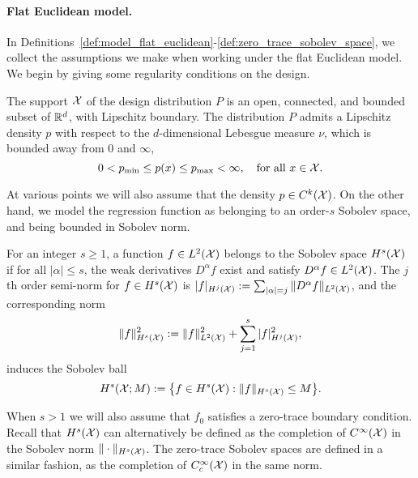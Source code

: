 \paragraph{Flat Euclidean model.}
In Definitions~\ref{def:model_flat_euclidean}-\ref{def:zero_trace_sobolev_space}, we collect the assumptions we make when working under the flat Euclidean model. We begin by giving some regularity conditions on the design.

\begin{definition}
	\label{def:model_flat_euclidean}
	The support $\mathcal{X}$ of the design distribution $P$ is an open, connected, and bounded subset of $\mathbb{R}^d$, with Lipschitz boundary. The distribution $P$ admits a Lipschitz density $p$ with respect to the $d$-dimensional Lebesgue measure $\nu$, which is bounded away from $0$ and $\infty$,
	\begin{equation*}
	0 < p_{\min} \leq p(x) \leq p_{\max} < \infty, \quad \textrm{for all $x \in \mathcal{X}$.}
	\end{equation*}
\end{definition}
At various points we will also assume that the density $p \in C^k(\mathcal{X})$. On the other hand, we model the regression function as belonging to an order-$s$ Sobolev space, and being bounded in Sobolev norm.
\begin{definition}
	\label{def:sobolev_space}
	For an integer $s \geq 1$, a function $f \in L^2(\mathcal{X})$ belongs to the Sobolev space $H^s(\mathcal{X})$ if for all $|\alpha| \leq s$, the weak derivatives $D^{\alpha}f$ exist and satisfy $D^{\alpha}f \in L^2(\mathcal{X})$. The $j$th order semi-norm for $f \in H^s(\mathcal{X})$ is $|f|_{H^j(\mathcal{X})} := \sum_{|\alpha| = j}\|D^{\alpha}f\|_{L^2(\mathcal{X})}$, and the corresponding norm
	\begin{equation*}
	\|f\|_{H^s(\mathcal{X})}^2 := \|f\|_{L^2(\mathcal{X})}^2 + \sum_{j = 1}^{s} |f|_{H^j(\mathcal{X})}^2,
	\end{equation*}
	induces the Sobolev ball
	\begin{equation*}
	H^s(\mathcal{X};M) := \bigl\{f \in H^s(\mathcal{X}): \|f\|_{H^s(\mathcal{X})} \leq M\bigr\}.
	\end{equation*} 
\end{definition}
When $s > 1$ we will also assume that $f_0$ satisfies a zero-trace boundary condition. Recall that $H^s(\mathcal{X})$ can alternatively be defined as the completion of $C^{\infty}(\mathcal{X})$ in the Sobolev norm $\|\cdot\|_{H^s(\mathcal{X})}$. The zero-trace Sobolev spaces are defined in a similar fashion, as the completion of $C_c^{\infty}(\mathcal{X})$ in the same norm.

